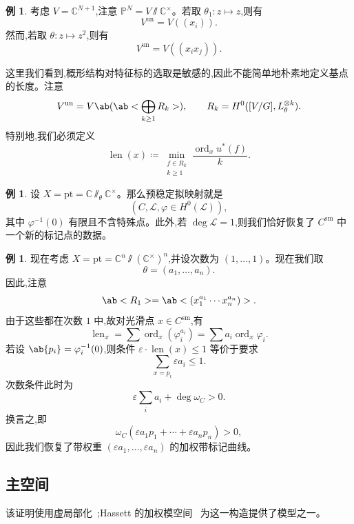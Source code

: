 \documentclass{amsart}
\theoremstyle{definition}
\newtheorem{exm}[thm]{例}
\theoremstyle{remark}
\theoremstyle{plain}
\theoremstyle{definition}
\theoremstyle{remark}
\newcommand{\C}{\mathbb{C}}
\renewcommand{\P}{\mathbb{P}}
\newcommand{\ep}{\varepsilon}
\newcommand{\mc}[1]{\mathcal{#1}}
\newcommand{\mr}[1]{\mathrm{#1}}
\newcommand{\on}[1]{\operatorname{#1}}
\newcommand{\1}{\mathbf{1}}
\newcommand{\2}{\mathbf{2}}
\newcommand{\3}{\mathbf{3}}
\begin{document}
\begin{exm}
    考虑 \(V = \C^{N+1}\),注意 \(\P^N = V \sslash \C^{\times}\)。若取 \(\theta_1 \colon z \mapsto z\),则有
    \[ V^{\on{un}} = V((x_i)). \]
    然而,若取 \(\theta \colon z \mapsto z^2\),则有
    \[ V^{\on{un}} = V((x_i x_j)). \]
\end{exm}

这里我们看到,概形结构对特征标的选取是敏感的,因此不能简单地朴素地定义基点的长度。注意
\[ V^{\on{un}} = V\ab(\ab< \bigoplus_{k \geq 1} R_k>), \qquad R_k = H^0([V/G], L_{\theta}^{\otimes k}). \]
特别地,我们必须定义
\[ \on{len}(x) \coloneqq \min_{\substack{f \in R_k \\ k \geq 1}} \frac{\on{ord}_x u^*(f)}{k}. \]

\begin{exm}
    设 \(X = \mr{pt} = \C \sslash_{\theta} \C^{\times}\)。那么预稳定拟映射就是
    \[ (C, \mc{L}, \varphi \in H^0(\mc{L})), \]
    其中 \(\varphi^{-1}(0)\) 有限且不含特殊点。此外,若 \(\deg \mc{L} = 1\),则我们恰好恢复了 \(C^{\mr{sm}}\) 中一个新的标记点的数据。
\end{exm}

\begin{exm}
    现在考虑 \(X = \mr{pt} = \C^n \sslash (\C^{\times})^n\),并设次数为 \((1, \ldots, 1)\)。现在我们取
    \[ \theta = (a_1, \ldots, a_n). \]
    因此,注意
    \[ \ab<R_1> = \ab<(x_1^{a_1} \cdots x_n^{a_n})>. \]
    由于这些都在次数 \(1\) 中,故对光滑点 \(x \in C^{\mr{sm}}\),有
    \[ \on{len}_x = \sum \on{ord}_x (\varphi_i^{a_i}) = \sum a_i \on{ord}_x \varphi_i. \]
    若设 \(\ab\{p_i\} = \varphi_i^{-1}(0)\),则条件 \(\ep \cdot \on{len}(x) \leq 1\) 等价于要求
    \[ \sum_{x = p_i} \ep a_i \leq 1. \]
    次数条件此时为
    \[ \ep \sum_i a_i + \deg \omega_C > 0. \]
    换言之,即
    \[ \omega_C(\ep a_1 p_1 + \cdots + \ep a_n p_n) > 0, \]
    因此我们恢复了带权重 \((\ep a_1, \ldots, \ep a_n)\) 的加权带标记曲线。
\end{exm}

\subsection{主空间}%
\label{sub:Master space}

该证明使用虚局部化~\cite{GP1999};Hassett 的加权模空间~\cite{Hassett2003} 为这一构造提供了模型之一。
\end{document}
